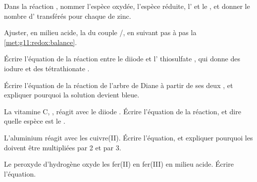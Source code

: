\begin{exercise}[$\star$]\label{exo:g11:redox:5}
Dans la réaction , nommer l'espèce
oxydée, l'espèce réduite, l' et le , et donner le nombre
d' transférés pour chaque  de zinc.
\end{exercise}

\begin{exercise}[$\star\star$]\label{exo:g11:redox:6}
Ajuster, en milieu acide, la  du couple
/, en suivant pas à pas la
\cref{met:g11:redox:balance}.
\end{exercise}

\begin{exercise}[$\star\star$]\label{exo:g11:redox:7}
Écrire l'équation de la réaction entre le diiode  et l'
thiosulfate , qui donne des  iodure et des 
tétrathionate .
\end{exercise}

\begin{exercise}[$\star\star$]\label{exo:g11:redox:8}
Écrire l'équation de la réaction de l'arbre de Diane à partir de ses
deux , et expliquer pourquoi la solution devient bleue.
\end{exercise}

\begin{exercise}[$\star\star$]\label{exo:g11:redox:9}
La vitamine C, , réagit avec le diiode . Écrire
l'équation de la réaction, et dire quelle espèce est le .
\end{exercise}

\begin{exercise}[$\star\star$]\label{exo:g11:redox:10}
L'aluminium réagit avec les  cuivre(II). Écrire l'équation, et
expliquer pourquoi les  doivent être multipliées par 2 et
par 3.
\end{exercise}

\begin{exercise}[$\star\star$]\label{exo:g11:redox:11}
Le peroxyde d'hydrogène oxyde les  fer(II) en  fer(III) en
milieu acide. Écrire l'équation.
\end{exercise}

